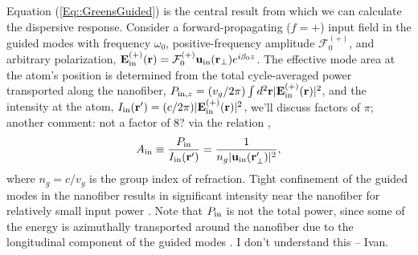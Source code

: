 \documentclass[preprint,aps,pra,onecolumn]{revtex4-1} %
\newcommand{\inp}{{\rm in}}
\newcommand{\fwd}{+}
\newcommand{\Eamp}{\mathcal{F}_0^{(+)}}
\newcommand{\comment}[1]{{\color{Maroon} #1}}
\begin{document}
Equation (\ref{Eq::GreensGuided}) is the central result from which we can calculate the dispersive response.  Consider a forward-propagating ($f=+$) input field in the guided modes with frequency $\omega_0$, positive-frequency amplitude $\Eamp$, and arbitrary polarization, $\mathbf{E}^{(+)}_{\inp}(\br) = \Eamp  \mathbf{u}_{\rm in}(\br_\perp) e^{i \beta_0 z}$. 
The effective mode area at the atom's position is determined from the total cycle-averaged power transported along the nanofiber, $P_{{\rm in},z} = (v_g/2\pi) \int d^2\br |\mathbf{E}^{(+)}_{\inp}(\br) |^2$, and the intensity at the atom, $I_{\rm in}(\mathbf{r}') = (c/2\pi) |\mathbf{E}^{(+)}_{\inp}(\br) |^2$,\comment{we'll discuss factors of $\pi$; another comment: not a factor of 8?} via the relation \cite{domokos_quantum_2002},
 	\begin{align} \label{Eq::AreaIn}
 		A_{\rm in} \equiv \frac{P_{{\rm in}}}{I_{\rm in}(\mathbf{r}')} = \frac{1}{n_g |\mathbf{u}_{\rm in}(\mathbf{r}'_\perp)|^{2}},
	\end{align}
where $n_g = c/v_g$ is the group index of refraction.  Tight confinement of the guided modes in the nanofiber results in significant intensity near the nanofiber for relatively small input power \cite{bures_power_1999}.  Note that $P_{\rm in}$ is not the total power, since some of the energy is azimuthally transported around the nanofiber due to the longitudinal component of the guided modes \cite{le_kien_scattering_2006}.\comment{I don't understand this -- Ivan}.
\end{document}
